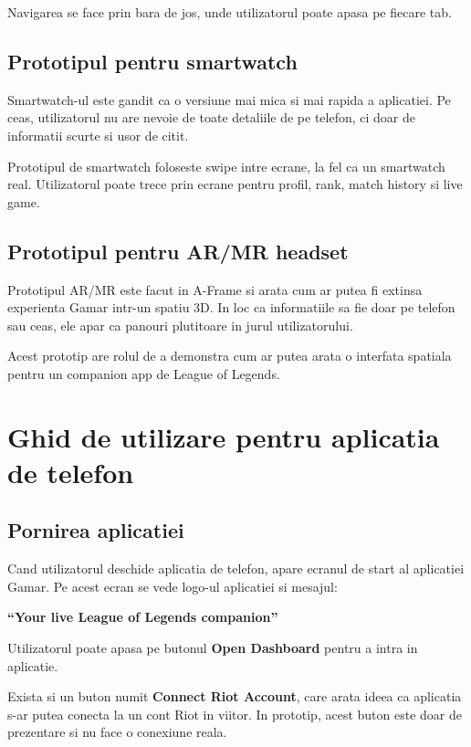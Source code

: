 \documentclass[12pt,a4paper]{article}
\begin{document}
Navigarea se face prin bara de jos, unde utilizatorul poate apasa pe fiecare tab.

\subsection{Prototipul pentru smartwatch}

Smartwatch-ul este gandit ca o versiune mai mica si mai rapida a aplicatiei. Pe ceas, utilizatorul nu are nevoie de toate detaliile de pe telefon, ci doar de informatii scurte si usor de citit.

Prototipul de smartwatch foloseste swipe intre ecrane, la fel ca un smartwatch real. Utilizatorul poate trece prin ecrane pentru profil, rank, match history si live game.

\subsection{Prototipul pentru AR/MR headset}

Prototipul AR/MR este facut in A-Frame si arata cum ar putea fi extinsa experienta Gamar intr-un spatiu 3D. In loc ca informatiile sa fie doar pe telefon sau ceas, ele apar ca panouri plutitoare in jurul utilizatorului.

Acest prototip are rolul de a demonstra cum ar putea arata o interfata spatiala pentru un companion app de League of Legends.

\section{Ghid de utilizare pentru aplicatia de telefon}

\subsection{Pornirea aplicatiei}

Cand utilizatorul deschide aplicatia de telefon, apare ecranul de start al aplicatiei Gamar. Pe acest ecran se vede logo-ul aplicatiei si mesajul:

\begin{center}
    \textbf{``Your live League of Legends companion''}
\end{center}

Utilizatorul poate apasa pe butonul \textbf{Open Dashboard} pentru a intra in aplicatie.

Exista si un buton numit \textbf{Connect Riot Account}, care arata ideea ca aplicatia s-ar putea conecta la un cont Riot in viitor. In prototip, acest buton este doar de prezentare si nu face o conexiune reala.
\end{document}
